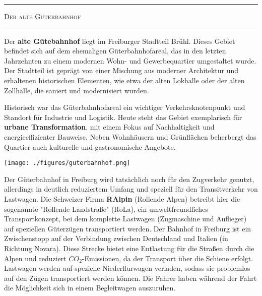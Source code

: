 \documentclass[landscape, a4paper]{article}
\newcommand\alert[1]{\textcolor{PrimaryColor}{\textbf{#1}}}
\begin{document}
\footnotesize
\begin{minipage}[t]{0.32\textwidth}
	\vspace{0cm}
	\setlength{\parskip}{0.25cm}
	\vspace{0.5cm}
	\textcolor{PrimaryColor}{
		\rule{\linewidth}{0.5mm}
		\vspace{-0.1cm}
		\begin{center}
			\large
			\textsc{Der alte Güterbahnhof}
		\end{center}
		\rule{\linewidth}{0.5mm}
	}

	Der \alert{alte Gütebahnhof} liegt im Freiburger Stadtteil Brühl. Dieses Gebiet befindet sich auf dem ehemaligen Güterbahnhofareal, das in den letzten Jahrzehnten zu einem modernen Wohn- und Gewerbequartier umgestaltet wurde. Der Stadtteil ist geprägt von einer Mischung aus moderner Architektur und erhaltenen historischen Elementen, wie etwa der alten Lokhalle oder der alten Zollhalle, die saniert und modernisiert wurden.

	Historisch war das Güterbahnhofareal ein wichtiger Verkehrsknotenpunkt und Standort für Industrie und Logistik. Heute steht das Gebiet exemplarisch für \alert{urbane Transformation}, mit einem Fokus auf Nachhaltigkeit und energieeffizienter Bauweise. Neben Wohnhäusern und Grünflächen beherbergt das Quartier auch kulturelle und gastronomische Angebote.%

	\texttt{[image: ./figures/guterbahnhof.png]}
	\setlength{\parskip}{0.25cm}

	Der Güterbahnhof in Freiburg wird tatsächlich noch für den Zugverkehr genutzt, allerdings in deutlich reduziertem Umfang und speziell für den Transitverkehr von Lastwagen. Die Schweizer Firma \alert{RAlpin} (Rollende Alpen) betreibt hier die sogenannte "Rollende Landstraße" (RoLa), ein umweltfreundliches Transportkonzept, bei dem komplette Lastwagen (Zugmaschine und Auflieger) auf speziellen Güterzügen transportiert werden. Der Bahnhof in Freiburg ist ein Zwischenstopp auf der Verbindung zwischen Deutschland und Italien (in Richtung Novara). Diese Strecke bietet eine Entlastung für die Straßen durch die Alpen und reduziert $CO_2$-Emissionen, da der Transport über die Schiene erfolgt. Lastwagen werden auf spezielle Niederflurwagen verladen, sodass sie problemlos auf den Zügen transportiert werden können. Die Fahrer haben während der Fahrt die Möglichkeit sich in einem Begleitwagen auszuruhen.

\end{minipage}
\end{document}
